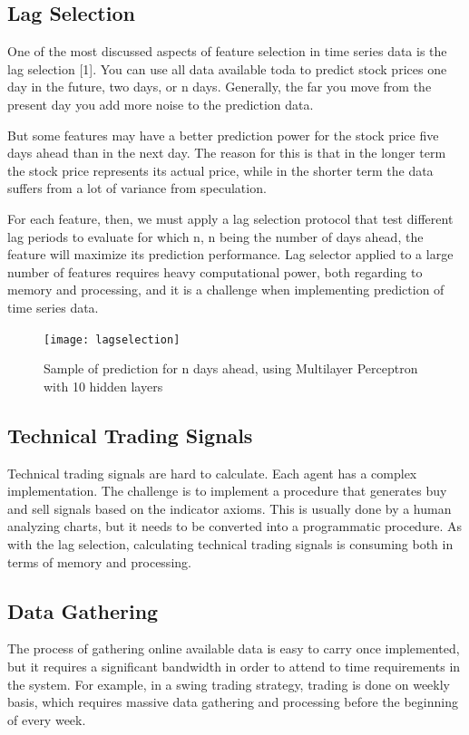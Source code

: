 \documentclass[prodmode,acmtecs]{acmsmall} %
\begin{document}
\subsection {Lag Selection}

One of the most discussed aspects of feature selection in time series data is the lag selection [1]. You can use all data available toda to predict stock prices one day in the future, two days, or n days. Generally, the far you move from the present day you add more noise to the prediction data. 

But some features may have a better prediction power for the stock price five days ahead than in the next day. The reason for this is that in the longer term the stock price represents its actual price, while in the shorter term the data suffers from a lot of variance from speculation. 

For each feature, then, we must apply a lag selection protocol that test different lag periods to evaluate for which n, n being the number of days ahead, the feature will maximize its prediction performance. Lag selector applied to a large number of features requires heavy computational power, both regarding to memory and processing, and it is a challenge when implementing prediction of time series data.

\begin{figure}
	\centering
	\texttt{[image: lagselection]}
	\caption{Sample of prediction for n days ahead, using Multilayer Perceptron with 10 hidden layers}
	\label{fig:one}
\end{figure}

\subsection {Technical Trading Signals}

Technical trading signals are hard to calculate. Each agent has a complex implementation. The challenge is to implement a procedure that generates buy and sell signals based on the indicator axioms. This is usually done by a human analyzing charts, but it needs to be converted into a programmatic procedure.  As with the lag selection, calculating technical trading signals is consuming both in terms of memory and processing. 

\subsection {Data Gathering}

The process of gathering online available data is easy to carry once implemented, but it requires a significant bandwidth in order to attend to time requirements in the system. For example, in a swing trading strategy, trading is done on weekly basis, which requires massive data gathering and processing before the beginning of every week. 
\end{document}
